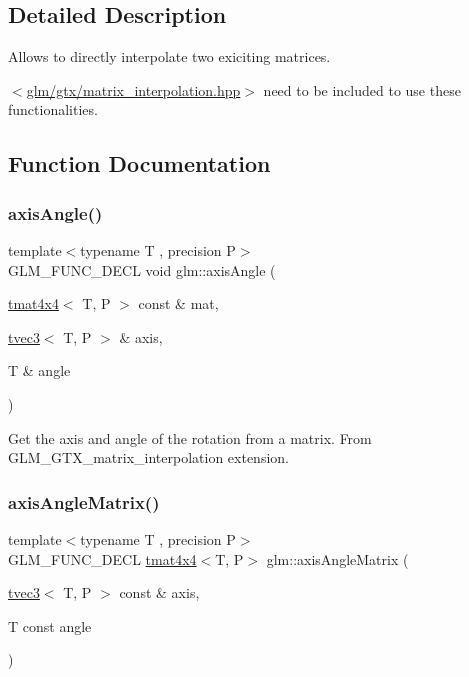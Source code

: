 \subsection{Detailed Description}
Allows to directly interpolate two exiciting matrices. 

$<$\hyperlink{matrix__interpolation_8hpp}{glm/gtx/matrix\+\_\+interpolation.\+hpp}$>$ need to be included to use these functionalities. 

\subsection{Function Documentation}
\mbox{\label{group__gtx__matrix__interpolation_ga9aef292eb5f29bdbb58a53ef4281af92}} 
\subsubsection{\texorpdfstring{axis\+Angle()}{axisAngle()}}
{\footnotesize\ttfamily template$<$typename T , precision P$>$ \\
G\+L\+M\+\_\+\+F\+U\+N\+C\+\_\+\+D\+E\+CL void glm\+::axis\+Angle (\begin{DoxyParamCaption}\item[{\hyperlink{structglm_1_1tmat4x4}{tmat4x4}$<$ T, P $>$ const \&}]{mat,  }\item[{\hyperlink{structglm_1_1tvec3}{tvec3}$<$ T, P $>$ \&}]{axis,  }\item[{T \&}]{angle }\end{DoxyParamCaption})}

Get the axis and angle of the rotation from a matrix. From G\+L\+M\+\_\+\+G\+T\+X\+\_\+matrix\+\_\+interpolation extension. \mbox{\label{group__gtx__matrix__interpolation_ga82d4bc058e9628cb2ea1d4e117a0cf39}} 
\subsubsection{\texorpdfstring{axis\+Angle\+Matrix()}{axisAngleMatrix()}}
{\footnotesize\ttfamily template$<$typename T , precision P$>$ \\
G\+L\+M\+\_\+\+F\+U\+N\+C\+\_\+\+D\+E\+CL \hyperlink{structglm_1_1tmat4x4}{tmat4x4}$<$T, P$>$ glm\+::axis\+Angle\+Matrix (\begin{DoxyParamCaption}\item[{\hyperlink{structglm_1_1tvec3}{tvec3}$<$ T, P $>$ const \&}]{axis,  }\item[{T const}]{angle }\end{DoxyParamCaption})}

